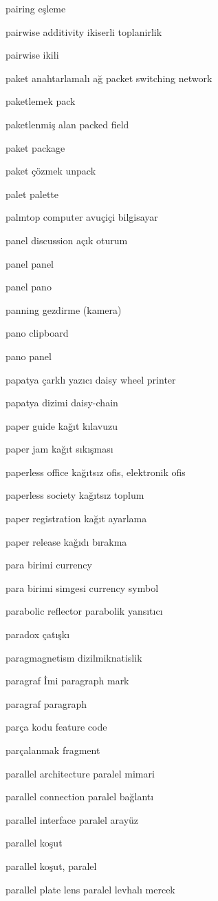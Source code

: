 \documentclass[12pt,fleqn]{article}\usepackage{../../common}
\begin{document}
pairing eşleme

pairwise additivity ikiserli toplanirlik

pairwise ikili

paket anahtarlamalı ağ packet switching network

paketlemek pack

paketlenmiş alan packed field

paket package

paket çözmek unpack

palet palette

palmtop computer avuçiçi bilgisayar

panel discussion açık oturum

panel panel

panel pano

panning gezdirme (kamera)

pano clipboard

pano panel

papatya çarklı yazıcı daisy wheel printer

papatya dizimi daisy-chain

paper guide kağıt kılavuzu

paper jam kağıt sıkışması

paperless office kağıtsız ofis, elektronik ofis

paperless society kağıtsız toplum

paper registration kağıt ayarlama

paper release kağıdı bırakma

para birimi currency

para birimi simgesi currency symbol

parabolic reflector parabolik yansıtıcı

paradox çatışkı

paragmagnetism dizilmiknatislik

paragraf İmi paragraph mark

paragraf paragraph

parça kodu feature code

parçalanmak fragment

parallel architecture paralel mimari

parallel connection paralel bağlantı

parallel interface paralel arayüz

parallel koşut

parallel koşut, paralel

parallel plate lens paralel levhalı mercek
\end{document}
